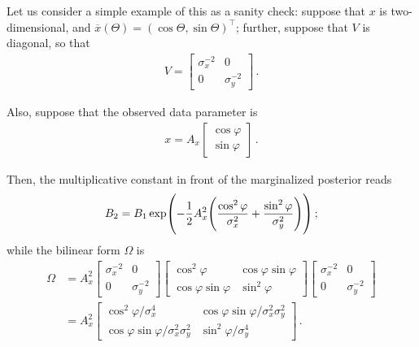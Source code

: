 \documentclass[main.tex]{subfiles}
\begin{document}

Let us consider a simple example of this as a sanity check: suppose that \(x\) is two-dimensional, and \(\overline{x}(\Theta ) = (\cos \Theta , \sin \Theta )^{\top}\); further, suppose that \(V\) is diagonal, so that 
%
\begin{align}
V = \left[\begin{array}{cc}
\sigma_x^{-2} & 0 \\ 
0 & \sigma _y^{-2}
\end{array}\right]
\,.
\end{align}

Also, suppose that the observed data parameter is 
%
\begin{align}
x = A_x \left[\begin{array}{c}
\cos \varphi  \\ 
\sin \varphi 
\end{array}\right]
\,.
\end{align}

Then, the multiplicative constant in front of the marginalized posterior reads 
%
\begin{align}
B_2 = B_1 \exp(- \frac{1}{2} A_x^2 \qty( \frac{\cos^2\varphi}{\sigma^2_x} + \frac{\sin^2\varphi}{\sigma^2_y}))
\,;
\end{align}
%
while the bilinear form \(\Omega \) is 
%
\begin{align}
\Omega &= A_x^2
\left[\begin{array}{cc}
\sigma_x^{-2} & 0 \\ 
0 & \sigma _y^{-2}
\end{array}\right]
\left[\begin{array}{cc}
\cos^2 \varphi  & \cos \varphi \sin \varphi  \\ 
\cos \varphi \sin \varphi  & \sin^2 \varphi 
\end{array}\right]
\left[\begin{array}{cc}
\sigma_x^{-2} & 0 \\ 
0 & \sigma _y^{-2}
\end{array}\right]  \\
&= A_x^2\left[\begin{array}{cc}
\cos^2 \varphi / \sigma_x^{4} & \cos \varphi \sin \varphi / \sigma_x^2 \sigma _y^2 \\ 
\cos \varphi \sin \varphi / \sigma_x^2 \sigma _y^2 & \sin^2 \varphi / \sigma_y^{4}
\end{array}\right]
\,.
\end{align}
\end{document}
